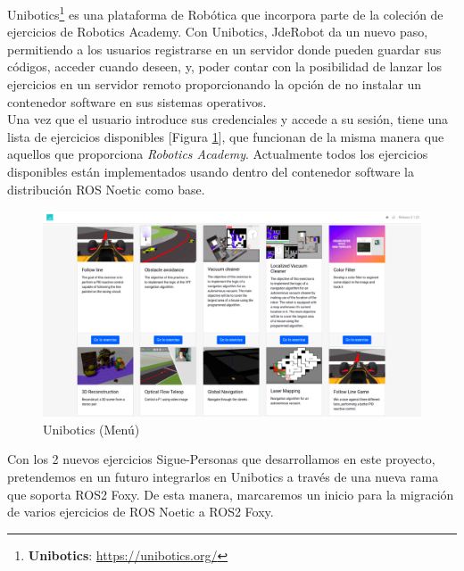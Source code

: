 Unibotics\footnote{\textbf{Unibotics}: \url{https://unibotics.org/}} es una plataforma de Robótica que incorpora parte de la coleción de ejercicios de Robotics Academy. Con Unibotics, JdeRobot da un nuevo paso, permitiendo a los usuarios registrarse en un servidor donde pueden guardar sus códigos, acceder cuando deseen, y, poder contar con la posibilidad de lanzar los ejercicios en un servidor remoto proporcionando la opción de no instalar un contenedor software en sus sistemas operativos.\\

Una vez que el usuario introduce sus credenciales y accede a su sesión, tiene una lista de ejercicios disponibles [Figura \ref{fig:menu-unibotics}], que funcionan de la misma manera que aquellos que proporciona \textit{Robotics Academy}. Actualmente todos los ejercicios disponibles están implementados usando dentro del contenedor software la distribución ROS Noetic como base.\\

\begin{figure} [H]
  \begin{center}
    \includegraphics[width=12cm]{imagenes/cap1/unibotics-menu.png}
  \end{center}
  \caption[Unibotics (Menú)]{Unibotics (Menú)}
  \label{fig:menu-unibotics}
\end{figure}

Con los 2 nuevos ejercicios Sigue-Personas que desarrollamos en este proyecto, pretendemos en un futuro integrarlos en Unibotics a través de una nueva rama que soporta ROS2 Foxy. De esta manera, marcaremos un inicio para la migración de varios ejercicios de ROS Noetic a ROS2 Foxy.\\




